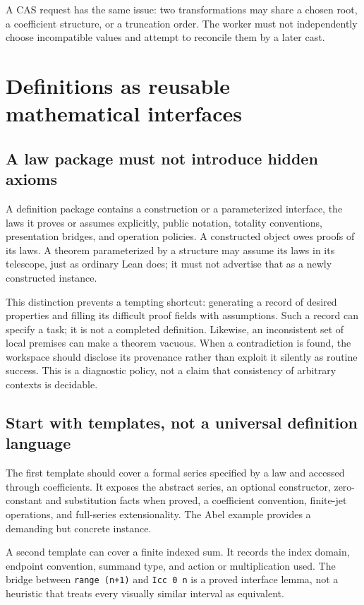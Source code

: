 \documentclass[11pt,letterpaper]{article}
\newcommand{\code}[1]{\nolinkurl{#1}}
\numberwithin{equation}{section}
\begin{document}
A CAS request has the same issue: two transformations may share a chosen root,
a coefficient structure, or a truncation order. The worker must not independently
choose incompatible values and attempt to reconcile them by a later cast.

\section{Definitions as reusable mathematical interfaces}\label{sec:definitions}
\subsection{A law package must not introduce hidden axioms}
A definition package contains a construction or a parameterized interface, the
laws it proves or assumes explicitly, public notation, totality conventions,
presentation bridges, and operation policies. A constructed object owes proofs
of its laws. A theorem parameterized by a structure may assume its laws in its
telescope, just as ordinary Lean does; it must not advertise that as a newly
constructed instance.

This distinction prevents a tempting shortcut: generating a record of desired
properties and filling its difficult proof fields with assumptions. Such a record
can specify a task; it is not a completed definition. Likewise, an inconsistent
set of local premises can make a theorem vacuous. When a contradiction is found,
the workspace should disclose its provenance rather than exploit it silently as
routine success. This is a diagnostic policy, not a claim that consistency of
arbitrary contexts is decidable.

\subsection{Start with templates, not a universal definition language}
The first template should cover a formal series specified by a law and accessed
through coefficients. It exposes the abstract series, an optional constructor,
zero-constant and substitution facts when proved, a coefficient convention,
finite-jet operations, and full-series extensionality. The Abel example provides
a demanding but concrete instance.

A second template can cover a finite indexed sum. It records the index domain,
endpoint convention, summand type, and action or multiplication used. The bridge
between \code{range (n+1)} and \code{Icc 0 n} is a proved interface lemma, not a
heuristic that treats every visually similar interval as equivalent.
\end{document}
